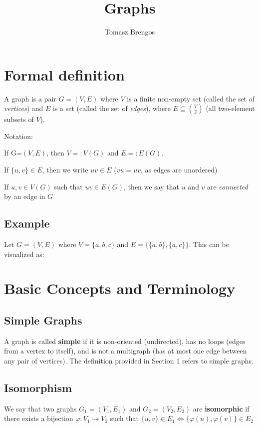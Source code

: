 \documentclass[docmute]{article}
\title{Graphs}
\author{Tomasz Brengos}
\date{}
\begin{document}
\maketitle


\section{Formal definition}
A graph is a pair \(G=(V,E)\) where \(V\) is a finite non-empty set (called the set of  \emph{vertices}) 
and \(E\) is a set (called the set of \emph{edges}), where \(E \subseteq \binom{V}{2}\) (all two-element subsets of \(V\)).
\medskip

Notation:\medskip

If G=\((V,E)\), then  \(V =: V(G)\) and \(E =: E(G)\).
\medskip

If \(\{u,v\} \in E\), then we write \(uv \in E\) (\(vu=uv\), as edges are unordered)
\medskip

If \(u,v \in V(G)\) such that \(uv \in E(G)\), then we say that \(u\) and \(v\) are \emph{connected} by an edge in \(G\)
\medskip

\subsection*{Example}
Let \(G = (V,E)\) where \(V = \{a,b,c\}\) and \(E = \{\{a,b\}, \{a,c\}\}\).
This can be visualized as:
\begin{center}
\end{center}

\section{Basic Concepts and Terminology}

\subsection*{Simple Graphs}
A graph is called \textbf{simple} if it is non-oriented (undirected), has no loops (edges from a vertex to itself), and is not a multigraph (has at most one edge between any pair of vertices). The definition provided in Section 1 refers to simple graphs.

\subsection*{Isomorphism}
We say that two graphs \(G_1 = (V_1, E_1)\) and \(G_2 = (V_2, E_2)\) are \textbf{isomorphic} 
if there exists a bijection \(\varphi: V_1 \to V_2\) such that 
\( \{u,v\} \in E_1 \iff \{\varphi(u),\varphi(v)\} \in E_2  \)
\end{document}
